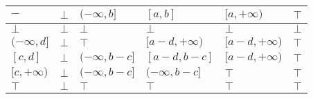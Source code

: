 \documentclass{article}
\begin{document}
    \begin{table}[]
        \begin{tabular}{|l|l|l|l|l|l|}
        \hline
        $-$            & $\bot$ & $(-\infty, b]$     & $[a, b]$           & $[a, +\infty)$     & $\top$ \\ \hline
        $\bot$         & $\bot$ & $\bot$             & $\bot$             & $\bot$             & $\bot$ \\ \hline
        $(-\infty, d]$ & $\bot$ & $\top$             & $[a - d, +\infty)$ & $[a - d, +\infty)$ & $\top$ \\ \hline
        $[c, d]$       & $\bot$ & $(-\infty, b - c]$ & $[a - d, b - c]$   & $[a - d, +\infty)$ & $\top$ \\ \hline
        $[c, +\infty)$ & $\bot$ & $(-\infty, b - c]$ & $(-\infty, b - c]$ & $\top$             & $\top$ \\ \hline
        $\top$         & $\bot$ & $\top$             & $\top$             & $\top$             & $\top$ \\ \hline
        \end{tabular}
        \end{table}

\end{document}
